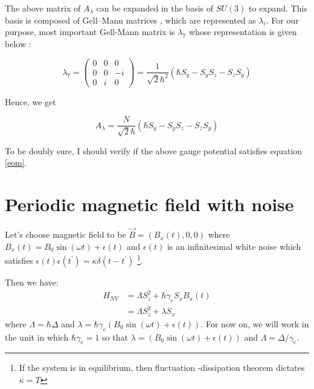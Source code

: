 \documentclass[11pt,a4paper]{article}
\begin{document}



The above matrix of $A_{\lambda}$ can be expanded in the basis of $SU(3)$ to expand. This basis is composed of Gell–Mann matrices \cite{gell1962symmetries}, which are represented as $\lambda_i$. For our purpose, most important Gell-Mann matrix is $\lambda_7$ whose representation is given below \cite{ bertlmann2008bloch, krammer2009entanglement}:

\begin{equation}
\lambda_7=
\begin{pmatrix}
0 & 0 & 0\\
0 & 0 & -i \\
0 & i & 0
\end{pmatrix}
= \dfrac{1}{\sqrt{2} \hbar^2}(\hbar S_y- S_y S_z-  S_z S_y)
\end{equation}

Hence, we get

\begin{equation}
\boxed{
A_{\lambda}=\dfrac{N}{\sqrt{2} \hbar}(\hbar S_y - S_y S_z-  S_z S_y)}
\end{equation}

To be doubly sure, I should verify if the above gauge potential satisfies equation \ref{eom}.
 
\section{Periodic magnetic field with noise}

Let's choose magnetic field to be $\vec{B}= (B_x (t), 0, 0)$ where $B_x(t)= B_0 \sin (\omega t) + \epsilon(t)$ and  $\epsilon(t)$ is an infinitesimal white noise which satisfies $\overline{ \epsilon(t) \epsilon(t^{\prime})}= \kappa \delta(t -t^{\prime})$ \footnote{If the system is in equilibrium, then fluctuation -dissipation theorem dictates $\kappa = T$}. 

Then we have: 
\begin{align*}
H_{NV} &= \Lambda S_z^2 + \hbar \gamma_e   S_x  B_x(t) \\
 &=  \Lambda S_z^2 + \lambda   S_x  
\end{align*}
where $\Lambda= \hbar \Delta $ and $\lambda=\hbar \gamma_e (B_0 \sin (\omega t) + \epsilon(t))$. For now on, we will work in the unit in which $\hbar \gamma_e =1$ so that  $\lambda= (B_0 \sin (\omega t) + \epsilon(t))$ and $\Lambda=  \Delta / \gamma_e $.
\end{document}
